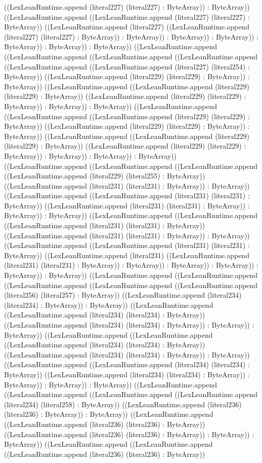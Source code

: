 \documentclass[11pt]{article}
\begin{document}
((LexLeanRuntime.append (literal227) (literal227) : ByteArray)) : ByteArray)) ((LexLeanRuntime.append ((LexLeanRuntime.append (literal227) (literal227) : ByteArray)) ((LexLeanRuntime.append (literal227) ((LexLeanRuntime.append (literal227) (literal227) : ByteArray)) : ByteArray)) : ByteArray)) : ByteArray)) : ByteArray)) : ByteArray)) : ByteArray)) ((LexLeanRuntime.append ((LexLeanRuntime.append ((LexLeanRuntime.append ((LexLeanRuntime.append ((LexLeanRuntime.append ((LexLeanRuntime.append (literal227) (literal254) : ByteArray)) ((LexLeanRuntime.append (literal229) (literal229) : ByteArray)) : ByteArray)) ((LexLeanRuntime.append ((LexLeanRuntime.append (literal229) (literal229) : ByteArray)) ((LexLeanRuntime.append (literal229) (literal229) : ByteArray)) : ByteArray)) : ByteArray)) ((LexLeanRuntime.append ((LexLeanRuntime.append ((LexLeanRuntime.append (literal229) (literal229) : ByteArray)) ((LexLeanRuntime.append (literal229) (literal229) : ByteArray)) : ByteArray)) ((LexLeanRuntime.append ((LexLeanRuntime.append (literal229) (literal229) : ByteArray)) ((LexLeanRuntime.append (literal229) (literal229) : ByteArray)) : ByteArray)) : ByteArray)) : ByteArray)) ((LexLeanRuntime.append ((LexLeanRuntime.append ((LexLeanRuntime.append ((LexLeanRuntime.append (literal229) (literal255) : ByteArray)) ((LexLeanRuntime.append (literal231) (literal231) : ByteArray)) : ByteArray)) ((LexLeanRuntime.append ((LexLeanRuntime.append (literal231) (literal231) : ByteArray)) ((LexLeanRuntime.append (literal231) (literal231) : ByteArray)) : ByteArray)) : ByteArray)) ((LexLeanRuntime.append ((LexLeanRuntime.append ((LexLeanRuntime.append (literal231) (literal231) : ByteArray)) ((LexLeanRuntime.append (literal231) (literal231) : ByteArray)) : ByteArray)) ((LexLeanRuntime.append ((LexLeanRuntime.append (literal231) (literal231) : ByteArray)) ((LexLeanRuntime.append (literal231) ((LexLeanRuntime.append (literal231) (literal231) : ByteArray)) : ByteArray)) : ByteArray)) : ByteArray)) : ByteArray)) : ByteArray)) ((LexLeanRuntime.append ((LexLeanRuntime.append ((LexLeanRuntime.append ((LexLeanRuntime.append ((LexLeanRuntime.append (literal256) (literal257) : ByteArray)) ((LexLeanRuntime.append (literal234) (literal234) : ByteArray)) : ByteArray)) ((LexLeanRuntime.append ((LexLeanRuntime.append (literal234) (literal234) : ByteArray)) ((LexLeanRuntime.append (literal234) (literal234) : ByteArray)) : ByteArray)) : ByteArray)) ((LexLeanRuntime.append ((LexLeanRuntime.append ((LexLeanRuntime.append (literal234) (literal234) : ByteArray)) ((LexLeanRuntime.append (literal234) (literal234) : ByteArray)) : ByteArray)) ((LexLeanRuntime.append ((LexLeanRuntime.append (literal234) (literal234) : ByteArray)) ((LexLeanRuntime.append (literal234) (literal234) : ByteArray)) : ByteArray)) : ByteArray)) : ByteArray)) ((LexLeanRuntime.append ((LexLeanRuntime.append ((LexLeanRuntime.append ((LexLeanRuntime.append (literal234) (literal258) : ByteArray)) ((LexLeanRuntime.append (literal236) (literal236) : ByteArray)) : ByteArray)) ((LexLeanRuntime.append ((LexLeanRuntime.append (literal236) (literal236) : ByteArray)) ((LexLeanRuntime.append (literal236) (literal236) : ByteArray)) : ByteArray)) : ByteArray)) ((LexLeanRuntime.append ((LexLeanRuntime.append ((LexLeanRuntime.append (literal236) (literal236) : ByteArray)) 
\end{document}

